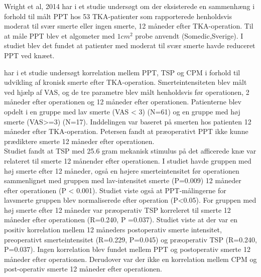 Wright et al, 2014 har i et studie undersøgt om der eksisterede en sammenhæng i forhold til målt PPT hos 53 TKA-patienter som rapporterede henholdsvis moderat til svær smerte eller ingen smerte, 12 måneder efter TKA-operation. Til at måle PPT blev et algometer med $1 cm^{2}$ probe anvendt (Somedic,Sverige). I studiet blev det fundet at patienter med moderat til svær smerte havde reduceret PPT ved knæet.

 har i et studie undersøgt korrelation mellem PPT, TSP og CPM i forhold til udvikling af kronisk smerte efter TKA-operation. Smerteintensiteten blev målt ved hjælp af VAS, og de tre parametre blev målt henholdsvis før operationen, 2 måneder efter operationen og 12 måneder efter operationen. Patienterne blev opdelt i en gruppe med lav smerte (VAS < 3) (N=61) og en gruppe med høj smerte (VAS>=3) (N=17). Inddelingen var baseret på smerten hos patienten 12 måneder efter TKA-operation. Petersen fandt at præoperativt PPT ikke kunne prædiktere smerte 12 måneder efter operationen. \\ %
Studiet fandt at TSP med 25.6 gram mekanisk stimulus på det afficerede knæ var relateret til smerte 12 månender efter operationen. I studiet havde gruppen med høj smerte efter 12 måneder, også en højere smerteintensitet før operationen sammenlignet med gruppen med lav-intensitet smerte (P=0.009) 12 måneder efter operationen (P < 0.001). Studiet viste også at PPT-målingerne for lavsmerte gruppen blev normaliserede efter operation (P<0.05). For gruppen med høj smerte efter 12 måneder var præoperativ TSP korreleret til smerte 12 måneder efter operationen (R=0.240, P =0.037).
Studiet viste at der var en positiv korrelation mellem 12 måneders postoperativ smerte intensitet, preoperativt smerteintensitet (R=0.229, P=0.045) og præoperativ TSP (R=0.240, P=0.037). Ingen korrelation blev fundet mellem PPT og postoperativ smerte 12 måneder efter operationen. Derudover var der ikke en korrelation mellem CPM og post-operativ smerte 12 måneder efter operationen. \citep{Petersen2015}

